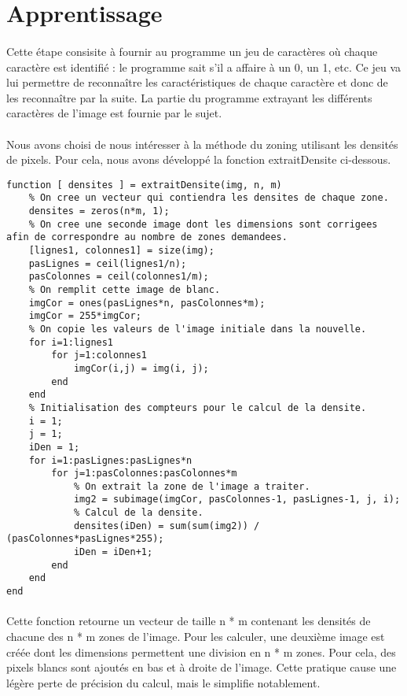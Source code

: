 \section{Apprentissage}

\paragraph{}
Cette étape consisite à fournir au programme un jeu de caractères où chaque caractère est identifié : le programme sait s'il a affaire à un 0, un 1, etc. 
Ce jeu va lui permettre de reconnaître les caractéristiques de chaque caractère et donc de les reconnaître par la suite. La partie du programme extrayant 
les différents caractères de l'image est fournie par le sujet. 

\paragraph{}
Nous avons choisi de nous intéresser à la méthode du zoning utilisant les densités de pixels. Pour cela, nous avons développé la fonction extraitDensite 
ci-dessous.
\\
\begin{lstlisting}
function [ densites ] = extraitDensite(img, n, m)
	% On cree un vecteur qui contiendra les densites de chaque zone.
	densites = zeros(n*m, 1);
	% On cree une seconde image dont les dimensions sont corrigees afin de correspondre au nombre de zones demandees.
	[lignes1, colonnes1] = size(img);
	pasLignes = ceil(lignes1/n);
	pasColonnes = ceil(colonnes1/m);
	% On remplit cette image de blanc.
	imgCor = ones(pasLignes*n, pasColonnes*m);
	imgCor = 255*imgCor;
	% On copie les valeurs de l'image initiale dans la nouvelle.
	for i=1:lignes1
		for j=1:colonnes1
			imgCor(i,j) = img(i, j);
		end
	end
	% Initialisation des compteurs pour le calcul de la densite.
	i = 1;
	j = 1;
	iDen = 1;
	for i=1:pasLignes:pasLignes*n
		for j=1:pasColonnes:pasColonnes*m
			% On extrait la zone de l'image a traiter.
			img2 = subimage(imgCor, pasColonnes-1, pasLignes-1, j, i);
			% Calcul de la densite.
			densites(iDen) = sum(sum(img2)) / (pasColonnes*pasLignes*255);
			iDen = iDen+1;
		end
	end
end
\end{lstlisting}

\paragraph{}
Cette fonction retourne un vecteur de taille n * m contenant les densités de chacune des n * m zones de l'image. Pour les calculer, une deuxième image 
est créée dont les dimensions permettent une division en n * m zones. Pour cela, des pixels blancs sont ajoutés en bas et à droite de l'image. Cette pratique 
cause une légère perte de précision du calcul, mais le simplifie notablement.

